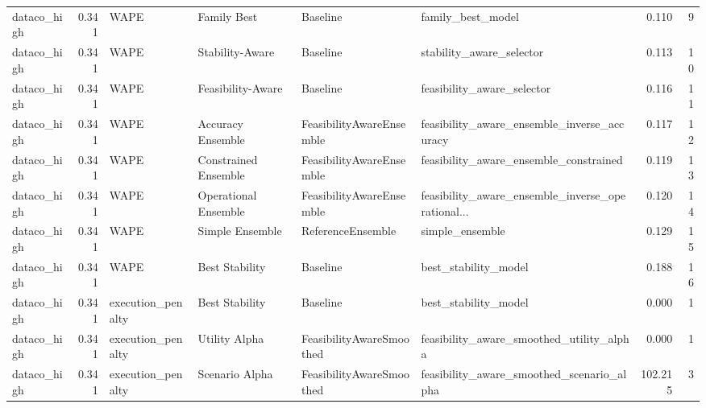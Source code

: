\begin{table}
{\begin{tabular}{lrllllrr}
   dataco\_high &             0.341 &                        WAPE &           Family Best &                  Baseline &                                  family\_best\_model &         0.110 &               9 \\
   dataco\_high &             0.341 &                        WAPE &       Stability-Aware &                  Baseline &                           stability\_aware\_selector &         0.113 &              10 \\
   dataco\_high &             0.341 &                        WAPE &     Feasibility-Aware &                  Baseline &                         feasibility\_aware\_selector &         0.116 &              11 \\
   dataco\_high &             0.341 &                        WAPE &     Accuracy Ensemble &  FeasibilityAwareEnsemble &        feasibility\_aware\_ensemble\_inverse\_accuracy &         0.117 &              12 \\
   dataco\_high &             0.341 &                        WAPE &  Constrained Ensemble &  FeasibilityAwareEnsemble &             feasibility\_aware\_ensemble\_constrained &         0.119 &              13 \\
   dataco\_high &             0.341 &                        WAPE &  Operational Ensemble &  FeasibilityAwareEnsemble &  feasibility\_aware\_ensemble\_inverse\_operational... &         0.120 &              14 \\
   dataco\_high &             0.341 &                        WAPE &       Simple Ensemble &         ReferenceEnsemble &                                    simple\_ensemble &         0.129 &              15 \\
   dataco\_high &             0.341 &                        WAPE &        Best Stability &                  Baseline &                               best\_stability\_model &         0.188 &              16 \\
   dataco\_high &             0.341 &           execution\_penalty &        Best Stability &                  Baseline &                               best\_stability\_model &         0.000 &               1 \\
   dataco\_high &             0.341 &           execution\_penalty &         Utility Alpha &  FeasibilityAwareSmoothed &           feasibility\_aware\_smoothed\_utility\_alpha &         0.000 &               1 \\
   dataco\_high &             0.341 &           execution\_penalty &        Scenario Alpha &  FeasibilityAwareSmoothed &          feasibility\_aware\_smoothed\_scenario\_alpha &       102.215 &               3 \\

\end{tabular}}
\end{table}

